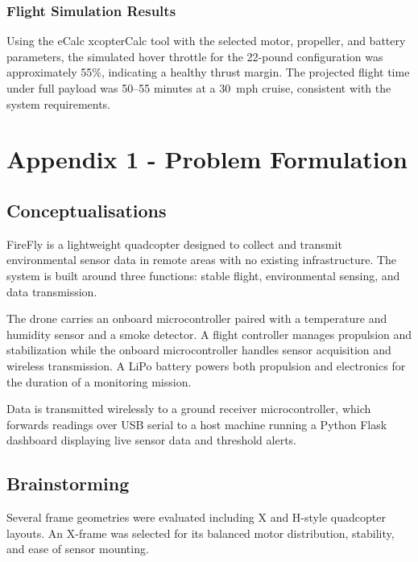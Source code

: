 \documentclass[journal, onecolumn]{IEEEtran}
\begin{document}
\subsubsection{Flight Simulation Results}
Using the eCalc xcopterCalc tool with the selected motor, propeller, and battery parameters, the simulated hover throttle for the 22-pound configuration was approximately 55\%, indicating a healthy thrust margin. The projected flight time under full payload was 50--55 minutes at a 30~mph cruise, consistent with the system requirements.


\section{Appendix 1 - Problem Formulation}

\subsection{Conceptualisations}

FireFly is a lightweight quadcopter designed to collect and transmit
environmental sensor data in remote areas with no existing infrastructure.
The system is built around three functions: stable flight, environmental
sensing, and data transmission.

\vspace{0.5em}

The drone carries an onboard microcontroller paired with a temperature and humidity sensor and a smoke detector. A flight controller manages propulsion and stabilization while the onboard microcontroller handles sensor acquisition and wireless transmission. A LiPo battery powers both propulsion and electronics for the duration of a monitoring mission.

\vspace{0.5em}

Data is transmitted wirelessly to a ground receiver microcontroller, which forwards readings over USB serial to a host machine running a Python Flask dashboard displaying live sensor data and threshold alerts.

\subsection{Brainstorming}
Several frame geometries were evaluated including X and H-style quadcopter
layouts. An X-frame was selected for its balanced motor distribution,
stability, and ease of sensor mounting.
\end{document}

